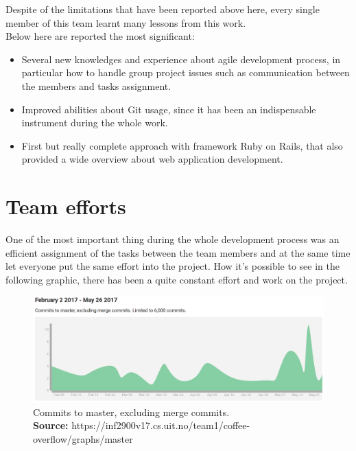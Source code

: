Despite of the limitations that have been reported above here, every single member of this team learnt many lessons from this work. \\
Below here are reported the most significant:
\vspace{-5mm}
\begin{itemize}
\item Several new knowledges and experience about agile development process, in particular how to handle group project issues such as communication between the members and tasks assignment. 
\item Improved abilities about Git usage, since it has been an indispensable instrument during the whole work.
\item First but really complete approach with framework Ruby on Rails, that also provided a wide overview about web application development.
\end{itemize}

\newpage

\section{Team efforts}
\vspace{-5mm}
One of the most important thing during the whole development process was an efficient assignment of the tasks between the team members and at the same time let everyone put the same effort into the project.
How it's possible to see in the following graphic, there has been a quite constant effort and work on the project.

\begin{figure}[H]
	\centering
    \includegraphics[trim={0 0 0 0},clip,width=1\textwidth]{Files/commitsToMaster.png}
    \caption{Commits to master, excluding merge commits.\\ \textbf{Source:} https://inf2900v17.cs.uit.no/team1/coffee-overflow/graphs/master}
    \label{fig: MVC}
\end{figure}


